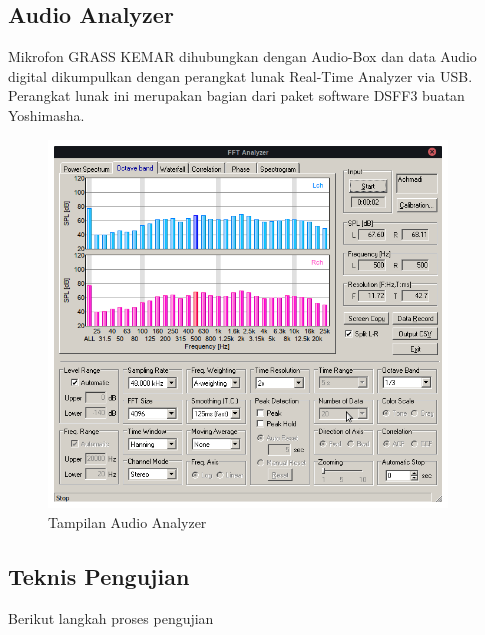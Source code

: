 \documentclass[12pt,]{article}
\begin{document}
	\subsection{Audio Analyzer}

	Mikrofon GRASS KEMAR dihubungkan dengan Audio-Box dan data Audio digital dikumpulkan dengan perangkat lunak Real-Time Analyzer via USB.
	Perangkat lunak ini merupakan bagian dari paket software DSFF3 buatan Yoshimasha.

	\begin{figure}[!ht]
		\centering
		\includegraphics[width=300pt]{images/kemar/fft}
		\caption{Tampilan Audio Analyzer}
	\end{figure}

	\newpage
	\subsection{Teknis Pengujian}

	Berikut langkah proses pengujian
\end{document}
